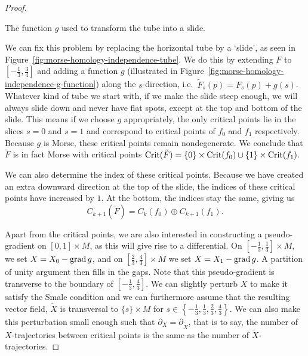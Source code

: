\begin{proof}
\begin{marginfigure}
    \centering
    \caption{The function $g$ used to transform the tube into a slide.}
    \label{fig:morse-homology-independence-g-function}
\end{marginfigure}

We can fix this problem by replacing the horizontal tube by a `slide', as seen in Figure~\ref{fig:morse-homology-independence-tube}.
We do this by extending $F$ to $[-\frac{1}{3}, \frac{3}{4}]$ and adding a function $g$ (illustrated in Figure~\ref{fig:morse-homology-independence-g-function}) along the $s$-direction, i.e.\ $\tilde{F}_s(p) = F_s(p) + g(s)$.
Whatever kind of tube we start with, if we make the slide steep enough, we will always slide down and never have flat spots, except at the top and bottom of the slide.
This means if we choose $g$ appropriately, the only critical points lie in the slices $s=0$ and  $s=1$ and correspond to critical points of $f_0$ and $f_1$ respectively.
Because $g$ is Morse, these critical points remain nondegenerate.
We conclude that $\tilde{F}$ is in fact Morse with critical points $\operatorname{Crit}(\tilde{F}) = \{0\} \times \operatorname{Crit}(f_0) \cup \{1\} \times \operatorname{Crit}(f_1)$.

We can also determine the index of these critical points.
Because we have created an extra downward direction at the top of the slide, the indices of these critical points have increased by $1$.
At the bottom, the indices stay the same, giving us
\[
    C_{k+1}(\tilde{F}) = C_k(f_0) \oplus C_{k+1}(f_1)
.\] 

Apart from the critical points, we are also interested in constructing a pseudo-gradient on $[0,1]\times M$, as this will give rise to a differential.
 On $[-\frac{1}{3}, \frac{1}{3}] \times M$, we set $X = X_0 - \operatorname{grad} g$, and on $\left[\frac{2}{3}, \frac{4}{3}\right] \times M$ we set $X = X_1 - \operatorname{grad} g$.
A partition of unity argument then fills in the gaps.
Note that this pseudo-gradient is transverse to the boundary of $\left[-\frac{1}{3}, \frac{4}{3}\right]$.
We can slightly perturb $X$ to make it satisfy the Smale condition and we can furthermore assume that the resulting vector field, $\tilde{X}$ is transversal to $ \{s\} \times M$ for $s \in \left\{-\frac{1}{3}, \frac{1}{3}, \frac{2}{3}, \frac{4}{3}\right\}$.
We can also make this perturbation small enough such that $\partial_{X} = \partial_{\tilde{X}}$, that is to say, the number of $X$-trajectories between critical points is the same as the number of $\tilde{X}$-trajectories.


\end{proof}
